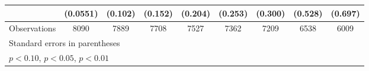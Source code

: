 \begin{table}[htbp]
\begin{tabular}{l*{8}{c}}
                    &    (0.0551)         &     (0.102)         &     (0.152)         &     (0.204)         &     (0.253)         &     (0.300)         &     (0.528)         &     (0.697)         \\
\hline
Observations        &        8090         &        7889         &        7708         &        7527         &        7362         &        7209         &        6538         &        6009         \\
\hline\hline
\multicolumn{9}{l}{\footnotesize Standard errors in parentheses}\\
\multicolumn{9}{l}{\footnotesize \sym{*} \(p<0.10\), \sym{**} \(p<0.05\), \sym{***} \(p<0.01\)}\\
\end{tabular}
\end{table}
